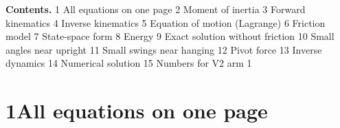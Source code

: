 \documentclass[11pt]{article}
\begin{document}
\vspace{8pt}
\textbf{Contents.} 1 All equations on one page \textperiodcentered{} 2 Moment of inertia \textperiodcentered{} 3 Forward kinematics \textperiodcentered{} 4 Inverse kinematics \textperiodcentered{} 5 Equation of motion (Lagrange) \textperiodcentered{} 6 Friction model \textperiodcentered{} 7 State-space form \textperiodcentered{} 8 Energy \textperiodcentered{} 9 Exact solution without friction \textperiodcentered{} 10 Small angles near upright \textperiodcentered{} 11 Small swings near hanging \textperiodcentered{} 12 Pivot force \textperiodcentered{} 13 Inverse dynamics \textperiodcentered{} 14 Numerical solution \textperiodcentered{} 15 Numbers for V2 arm 1

\newpage
\section*{1\quad All equations on one page}
\renewcommand{\arraystretch}{1.55}
\end{document}
